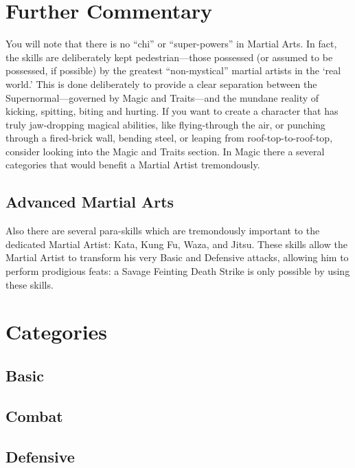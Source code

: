 \documentclass[twoside]{book}
\begin{document}
\section{Further Commentary}
      You will note that there is no “chi” or
             “super-powers” in Martial Arts. In fact, the
             skills are deliberately kept pedestrian—those
             possessed (or assumed to be possessed, if possible) by the
             greatest “non-mystical” martial artists in the
             ‘real world.’ This is done deliberately to
             provide a clear separation between the
             Supernormal—governed by Magic and Traits—and the
             mundane reality of kicking, spitting, biting and hurting. If
             you want to create a character that has truly jaw-dropping
             magical abilities, like flying-through the air, or punching
             through a fired-brick wall, bending steel, or leaping from
             roof-top-to-roof-top, consider looking into the Magic and
             Traits section. In Magic there a several categories that
             would benefit a Martial Artist tremondously. 
\subsection{Advanced Martial Arts}
      Also there are several para-skills which are
               tremondously important to the dedicated Martial Artist:
               Kata, Kung Fu, Waza, and Jitsu. These skills allow the
               Martial Artist to transform his very Basic and Defensive
               attacks, allowing him to perform prodigious feats: a
               Savage Feinting Death Strike is only possible by using
               these skills. 
\section{Categories}
    
\subsection{Basic}
    
\subsection{Combat}
    
\subsection{Defensive}
    
\end{document}
